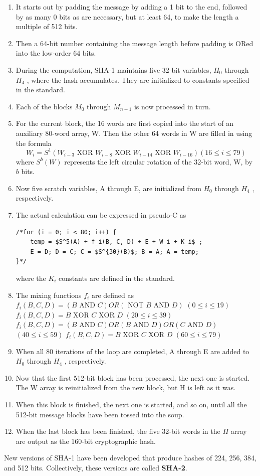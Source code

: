 \documentclass[a4paper,oneside]{book}
\begin{document}
\begin{enumerate}
\item  It starts out by padding the message by adding a 1 bit to the end, followed by as many 0 bits as are necessary, but at least 64, to make the length a multiple of 512 bits. 
\item Then a 64-bit number containing the message length before padding is ORed into the low-order 64 bits.
\item During the computation, SHA-1 maintains five 32-bit variables, $H_0$ through $H_4$ , where the hash accumulates. They are initialized to constants specified in the standard.
\item Each of the blocks $M_0$ through $M_{n −1}$ is now processed in turn.
\item For the current block, the 16 words are first copied into the start of an auxiliary 80-word array, W. Then the other 64 words in W are filled in using the formula 
$$W_i = S^1 (W_{i - 3} \text{ XOR } W_{i - 8} \text{ XOR } W_{i -14} \text{ XOR } W_{i -16} )   (16 \le i \le 79)$$
where $S^b(W)$  represents the left circular rotation of the 32-bit word, W, by $b$ bits.
\item Now five scratch variables, A through E, are initialized from $H_0$ through $H_4$ , respectively.
\item The actual calculation can be expressed in pseudo-C as
\begin{verbatim}
/*for (i = 0; i < 80; i++) {
	temp = $S^5(A) + f_i(B, C, D) + E + W_i + K_i$ ;
	E = D; D = C; C = $S^{30}(B)$; B = A; A = temp;
}*/
\end{verbatim}
where the $K_i$ constants are defined in the standard. 
\item The mixing functions $f_i$ are defined as \\
$ f_i (B,C,D) = (B \text{ AND } C) OR (\text{ NOT } B \text{ AND } D)$ \hfill $( 0 \le i \le 19) $
$ f_i (B,C,D) = B \text{ XOR } C \text{ XOR } D$ \hfill 
$ (20 \le i \le 39) $
$ f_i (B,C,D) = (B \text{ AND } C) OR (B \text{ AND } D) OR (C \text{ AND } D)$ \hfill 
 $(40 \le i \le 59) $
$ f_i (B,C,D) = B \text{ XOR } C \text{ XOR } D$   \hfill    $(60 \le i \le 79)$
\item When all 80 iterations of the loop are completed, A through E are added to $H_0$ through $H_4$ , respectively.
\item Now that the first 512-bit block has been processed, the next one is started. The W array is reinitialized from the new block, but H is left as it was. 
\item When this block is finished, the next one is started, and so on, until all the 512-bit message blocks have been tossed into the soup. \item When the last block has been finished, the five 32-bit words in the $H$ array are output as the 160-bit cryptographic hash.
\end{enumerate}
New versions of SHA-1 have been developed that produce hashes of 224, 256, 384, and 512 bits. Collectively, these versions are called \textbf{SHA-2}.
\end{document}
